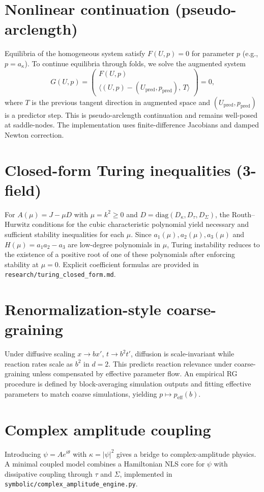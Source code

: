 
\section{Nonlinear continuation (pseudo-arclength)}
Equilibria of the homogeneous system satisfy $F(U,p)=0$ for parameter $p$ (e.g., $p=a_\kappa$).
To continue equilibria through folds, we solve the augmented system
\[
G(U,p)=
\begin{pmatrix}
F(U,p) \\
\langle (U,p)-(U_{\mathrm{pred}},p_{\mathrm{pred}}),\,T\rangle
\end{pmatrix}
=0,
\]
where $T$ is the previous tangent direction in augmented space and $(U_{\mathrm{pred}},p_{\mathrm{pred}})$
is a predictor step. This is pseudo-arclength continuation and remains well-posed at saddle-nodes.
The implementation uses finite-difference Jacobians and damped Newton correction.

\section{Closed-form Turing inequalities (3-field)}
For $A(\mu)=J-\mu D$ with $\mu=k^2\ge 0$ and $D=\mathrm{diag}(D_\kappa,D_\tau,D_\Sigma)$,
the Routh--Hurwitz conditions for the cubic characteristic polynomial yield necessary and sufficient stability
inequalities for each $\mu$. Since $a_1(\mu),a_2(\mu),a_3(\mu)$ and $H(\mu)=a_1a_2-a_3$ are low-degree polynomials in $\mu$,
Turing instability reduces to the existence of a positive root of one of these polynomials after enforcing stability at $\mu=0$.
Explicit coefficient formulas are provided in \texttt{research/turing\_closed\_form.md}.

\section{Renormalization-style coarse-graining}
Under diffusive scaling $x\to b x'$, $t\to b^2 t'$, diffusion is scale-invariant while reaction rates scale as $b^2$ in $d=2$.
This predicts reaction relevance under coarse-graining unless compensated by effective parameter flow.
An empirical RG procedure is defined by block-averaging simulation outputs and fitting effective parameters
to match coarse simulations, yielding $p\mapsto p_{\mathrm{eff}}(b)$.

\section{Complex amplitude coupling}
Introducing $\psi=Ae^{i\theta}$ with $\kappa=|\psi|^2$ gives a bridge to complex-amplitude physics.
A minimal coupled model combines a Hamiltonian NLS core for $\psi$ with dissipative coupling through $\tau$ and $\Sigma$,
implemented in \texttt{symbolic/complex\_amplitude\_engine.py}.

